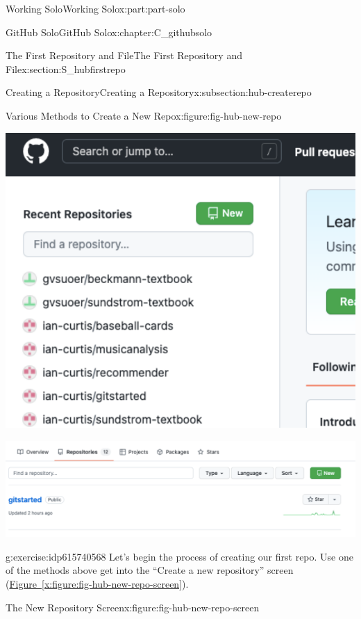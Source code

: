 \documentclass[oneside,10pt,]{book}
\newcommand{\xreffont}{\relax}
\begin{document}
\begin{partptx}{Working Solo}{}{Working Solo}{}{}{x:part:part-solo}
\begin{chapterptx}{GitHub Solo}{}{GitHub Solo}{}{}{x:chapter:C_githubsolo}
\begin{sectionptx}{The First Repository and File}{}{The First Repository and File}{}{}{x:section:S_hubfirstrepo}
\begin{subsectionptx}{Creating a Repository}{}{Creating a Repository}{}{}{x:subsection:hub-createrepo}
\begin{figureptx}{Various Methods to Create a New Repo}{x:figure:fig-hub-new-repo}{}
\begin{sidebyside}{2}{0.025}{0.025}{0.05}
\begin{sbspanel}{0.45}
\includegraphics[width=\linewidth]{external/hub_new_repo_home.pdf}
\end{sbspanel}%
\end{sidebyside}%
\begin{image}{0.05}{0.9}{0.05}%
\includegraphics[width=\linewidth]{external/hub_new_repo_yourrepos.pdf}
\end{image}%
\tcblower
\end{figureptx}%
\begin{inlineexercise}{}{g:exercise:idp615740568}%
Let's begin the process of creating our first repo. Use one of the methods above get into the ``Create a new repository'' screen (\hyperref[x:figure:fig-hub-new-repo-screen]{Figure~{\xreffont\ref{x:figure:fig-hub-new-repo-screen}}}).%
\end{inlineexercise}%
\begin{figureptx}{The New Repository Screen}{x:figure:fig-hub-new-repo-screen}{}%
\begin{image}{0.05}{0.9}{0.05}%

\end{image}
\end{figureptx}
\end{subsectionptx}
\end{sectionptx}
\end{chapterptx}
\end{partptx}
\end{document}
